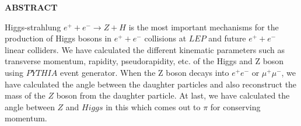 \begin{center}
{\large {\bf  ABSTRACT }}
\end{center}  

Higgs-strahlung $e^{+} + e^{-}\longrightarrow Z+H$ is the most important mechanisms for the production of Higgs bosons in  $e^{+} + e^{-}$ collisions at $LEP$ and future $e^{+} + e^{-}$ linear colliders. We have calculated the different kinematic parameters such as transverse momentum, rapidity, pseudorapidity, etc. of the Higgs and Z boson using $PYTHIA$ event generator.
When the Z boson decays into $e^{+}e^{-}$ or $\mu^{+}\mu^{-}$,
we have calculated the angle between the daughter particles and also reconstruct the mass of the $Z$ boson from the daughter particle.
At last, we have calculated the angle between $Z$ and $Higgs$ in this which comes out to $\pi$ for conserving momentum.